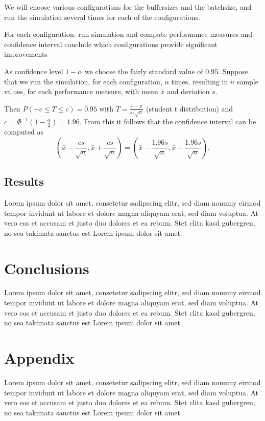 \documentclass{article}
\begin{document}
We will choose various configurations for the buffersizes and the batchsize, and run the simulation several times for each of the configurations.

For each configuration:
    run simulation and compute performance measures and confidence interval
    conclude which configurations provide significant improvements


As confidence level $1 - \alpha$ we choose the fairly standard value of $0.95$.
Suppose that we run the simulation, for each configuration, $n$ times, resulting in $n$ sample values, for each performance measure, with mean $\bar{x}$ and deviation $s$.

Then $P(-c \leq T \leq c) = 0.95 $ with $T = \frac{\bar{x} - \mu}{s/\sqrt{n}}$ (student t distribution) and $c = \Phi ^{-1} (1 - \frac{\alpha}{2})= 1.96$.
From this it follows that the confidence interval can be computed as
\[ (\bar{x} - \frac{cs}{\sqrt{n}}, \bar{x} + \frac{cs}{\sqrt{n}}) =
(\bar{x} - \frac{1.96s}{\sqrt{n}}, \bar{x} + \frac{1.96s}{\sqrt{n}}). \]


\subsection{Results}
Lorem ipsum dolor sit amet, consetetur sadipscing elitr, sed diam nonumy eirmod
tempor invidunt ut labore et dolore magna aliquyam erat, sed diam voluptua. At
vero eos et accusam et justo duo dolores et ea rebum. Stet clita kasd gubergren,
no sea takimata sanctus est Lorem ipsum dolor sit amet.


\section{Conclusions}
Lorem ipsum dolor sit amet, consetetur sadipscing elitr, sed diam nonumy eirmod
tempor invidunt ut labore et dolore magna aliquyam erat, sed diam voluptua. At
vero eos et accusam et justo duo dolores et ea rebum. Stet clita kasd gubergren,
no sea takimata sanctus est Lorem ipsum dolor sit amet.


\section{Appendix}
Lorem ipsum dolor sit amet, consetetur sadipscing elitr, sed diam nonumy eirmod
tempor invidunt ut labore et dolore magna aliquyam erat, sed diam voluptua. At
vero eos et accusam et justo duo dolores et ea rebum. Stet clita kasd gubergren,
no sea takimata sanctus est Lorem ipsum dolor sit amet.
\end{document}
